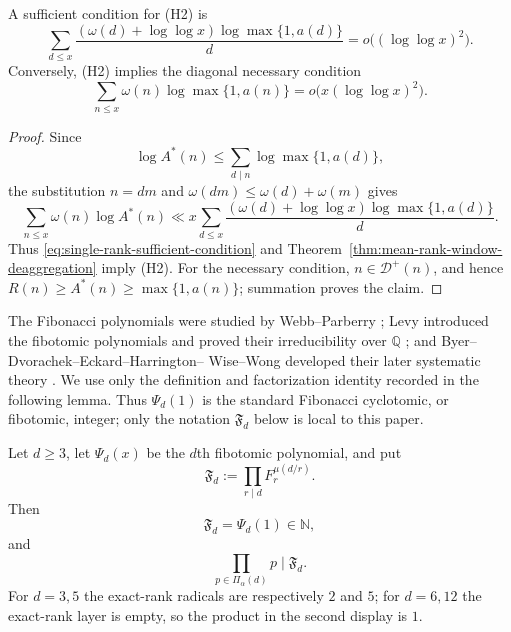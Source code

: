 \begin{corollary}
\label{cor:single-rank-mean-interfaces}
A sufficient condition for \textup{(H2)} is
\begin{equation}\label{eq:single-rank-sufficient-condition}
 \sum_{d\le x}
 \frac{(\omega(d)+\log\log x)\log\max\{1,a(d)\}}{d}
 =o\bigl((\log\log x)^2\bigr).
\end{equation}
Conversely, \textup{(H2)} implies the diagonal necessary condition
\begin{equation}\label{eq:single-rank-necessary-condition}
 \sum_{n\le x}\omega(n)\log\max\{1,a(n)\}
 =o\bigl(x(\log\log x)^2\bigr).
\end{equation}
\end{corollary}

\begin{proof}
Since
\[
 \log A^*(n)\le\sum_{d\mid n}\log\max\{1,a(d)\},
\]
the substitution $n=dm$ and $\omega(dm)\le\omega(d)+\omega(m)$ gives
\[
 \sum_{n\le x}\omega(n)\log A^*(n)
 \ll x\sum_{d\le x}
 \frac{(\omega(d)+\log\log x)\log\max\{1,a(d)\}}{d}.
\]
Thus \eqref{eq:single-rank-sufficient-condition} and
Theorem~\ref{thm:mean-rank-window-deaggregation} imply \textup{(H2)}. For the
necessary condition, $n\in\mathcal D^+(n)$, and hence
$R(n)\ge A^*(n)\ge\max\{1,a(n)\}$; summation proves the claim.
\end{proof}

The Fibonacci polynomials were studied by Webb--Parberry
\cite{WebbParberry1969FibonacciPolynomials}; Levy introduced the fibotomic
polynomials and proved their irreducibility over $\mathbb Q$
\cite{Levy2001FibonacciPolynomials}; and Byer--Dvorachek--Eckard--Harrington--
Wise--Wong developed their later systematic theory
\cite{CameronCountsLundMillerPiechnikWong2022Fibotomic}. We use only the
definition and factorization identity recorded in the following lemma.
Thus $\Psi_d(1)$ is the standard Fibonacci cyclotomic, or fibotomic,
integer; only the notation $\mathfrak F_d$ below is local to this paper.

\begin{lemma}
\label{lem:fibotomic-integer-radical}
Let $d\ge3$, let $\Psi_d(x)$ be the $d$th fibotomic polynomial, and put
\[
 \mathfrak F_d:=\prod_{r\mid d}F_r^{\mu(d/r)}.
\]
Then
\begin{equation}\label{eq:fibotomic-integer-identity}
 \mathfrak F_d=\Psi_d(1)\in\mathbb N,
\end{equation}
and
\begin{equation}\label{eq:exact-rank-radical-divides-fibotomic}
 \prod_{p\in\Pi_\alpha(d)}p\mid\mathfrak F_d.
\end{equation}
For $d=3,5$ the exact-rank radicals are respectively $2$ and $5$; for
$d=6,12$ the exact-rank layer is empty, so the product in the second display
is $1$.
\end{lemma}


